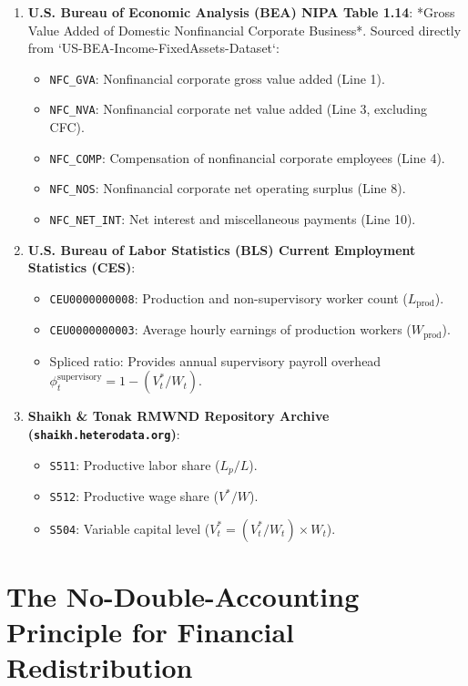 \documentclass[11pt,a4paper]{article}
\begin{document}
\begin{enumerate}
    \item \textbf{U.S. Bureau of Economic Analysis (BEA) NIPA Table 1.14}:  
    *Gross Value Added of Domestic Nonfinancial Corporate Business*. Sourced directly from `US-BEA-Income-FixedAssets-Dataset`:
    \begin{itemize}
        \item \texttt{NFC\_GVA}: Nonfinancial corporate gross value added (Line 1).
        \item \texttt{NFC\_NVA}: Nonfinancial corporate net value added (Line 3, excluding CFC).
        \item \texttt{NFC\_COMP}: Compensation of nonfinancial corporate employees (Line 4).
        \item \texttt{NFC\_NOS}: Nonfinancial corporate net operating surplus (Line 8).
        \item \texttt{NFC\_NET\_INT}: Net interest and miscellaneous payments (Line 10).
    \end{itemize}

    \item \textbf{U.S. Bureau of Labor Statistics (BLS) Current Employment Statistics (CES)}:
    \begin{itemize}
        \item \texttt{CEU0000000008}: Production and non-supervisory worker count ($L_{\text{prod}}$).
        \item \texttt{CEU0000000003}: Average hourly earnings of production workers ($W_{\text{prod}}$).
        \item Spliced ratio: Provides annual supervisory payroll overhead $\phi_t^{\text{supervisory}} = 1 - (V_t^* / W_t)$.
    \end{itemize}

    \item \textbf{Shaikh \& Tonak RMWND Repository Archive (\texttt{shaikh.heterodata.org})}:
    \begin{itemize}
        \item \texttt{S511}: Productive labor share ($L_p / L$).
        \item \texttt{S512}: Productive wage share ($V^* / W$).
        \item \texttt{S504}: Variable capital level ($V_t^* = (V_t^* / W_t) \times W_t$).
    \end{itemize}
\end{enumerate}

\FloatBarrier
\section{The No-Double-Accounting Principle for Financial Redistribution}
\end{document}
